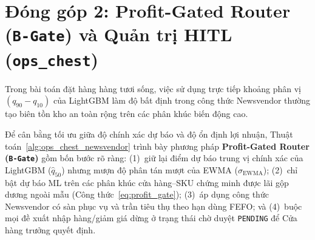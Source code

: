 \section{Đóng góp 2: Profit-Gated Router (\texttt{B-Gate}) và Quản trị HITL (\texttt{ops\_chest})}

Trong bài toán đặt hàng hàng tươi sống, việc sử dụng trực tiếp khoảng phân vị $(q_{90}-q_{10})$ của LightGBM làm độ bất định trong công thức Newsvendor thường tạo biên tồn kho an toàn rộng trên các phân khúc biến động cao.

Để cân bằng tối ưu giữa độ chính xác dự báo và độ ổn định lợi nhuận, Thuật toán~\ref{alg:ops_chest_newsvendor} trình bày phương pháp \textbf{Profit-Gated Router (\texttt{B-Gate})} gồm bốn bước rõ ràng: (1)~giữ lại điểm dự báo trung vị chính xác của LightGBM ($\hat{q}_{50}$) nhưng mượn độ phân tán mượt của EWMA ($\sigma_{\text{EWMA}}$); (2)~chỉ bật dự báo ML trên các phân khúc cửa hàng--SKU chứng minh được lãi gộp dương ngoài mẫu (Công thức~\ref{eq:profit_gate}); (3)~áp dụng công thức Newsvendor có sàn phục vụ và trần tiêu thụ theo hạn dùng FEFO; và (4)~buộc mọi đề xuất nhập hàng/giảm giá dừng ở trạng thái chờ duyệt \texttt{PENDING} để Cửa hàng trưởng quyết định.


